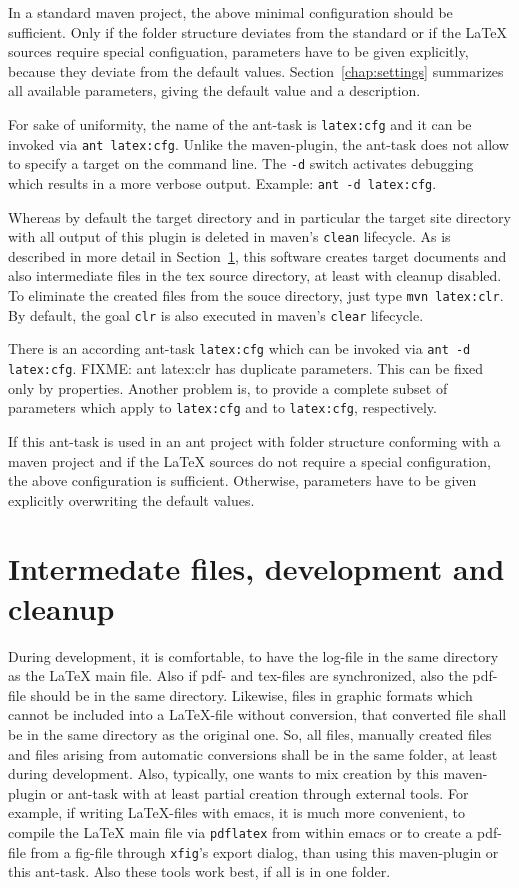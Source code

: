 \documentclass[12pt]{book}
\begin{document}
In a standard maven project, 
the above minimal configuration should be sufficient. 
Only if the folder structure deviates from the standard 
or if the \LaTeX{} sources require special configuation, 
parameters have to be given explicitly, 
because they deviate from the default values. 
Section~\ref{chap:settings} summarizes all available parameters, 
giving the default value and a description. 


For sake of uniformity, 
the name of the ant-task is {\tt latex:cfg} 
and it can be invoked via {\tt ant latex:cfg}. 
Unlike the maven-plugin, the ant-task 
does not allow to specify a target on the command line. 
The {\tt -d} switch activates debugging 
which results in a more verbose output. 
Example: {\tt ant -d latex:cfg}. 

Whereas by default the target directory and in particular 
the target site directory with all output of this plugin is deleted 
in maven's {\tt clean} lifecycle. 
As is described in more detail in Section~\ref{sec:devel}, 
this software creates target documents and also intermediate files 
in the tex source directory, at least with cleanup disabled. 
To eliminate the created files from the souce directory, 
just type {\tt mvn latex:clr}. 
By default, the goal {\tt clr} 
is also executed in maven's {\tt clear} lifecycle. 

There is an according ant-task {\tt latex:cfg} 
which can be invoked via {\tt ant -d latex:cfg}. 
FIXME: ant latex:clr has duplicate parameters. 
This can be fixed only by properties. 
Another problem is, to provide a complete subset of parameters 
which apply to {\tt latex:cfg} and to {\tt latex:cfg}, respectively. 

If this ant-task is used in an ant project 
with folder structure conforming with a maven project 
and if the \LaTeX{} sources do not require a special configuration, 
the above configuration is sufficient. 
Otherwise, parameters have to be given explicitly 
overwriting the default values. 

\section{Intermedate files, development and cleanup}\label{sec:devel}

During development, it is comfortable, 
to have the log-file in the same directory as the \LaTeX{} main file. 
Also if pdf- and tex-files are synchronized, 
also the pdf-file should be in the same directory. 
Likewise, files in graphic formats 
which cannot be included into a \LaTeX-file without conversion, 
that converted file shall be in the same directory as the original one. 
So, all files, manually created files 
and files arising from automatic conversions 
shall be in the same folder, at least during development. 
Also, typically, one wants to mix creation by this maven-plugin or ant-task 
with at least partial creation through external tools. 
For example, if writing \LaTeX-files with emacs, 
it is much more convenient, to compile the \LaTeX{} main file 
via {\tt pdflatex} from within emacs 
or to create a pdf-file from a \gls{fig}-file 
through {\tt xfig}'s export dialog, 
than using this maven-plugin or this ant-task. 
Also these tools work best, if all is in one folder. 
\end{document}
